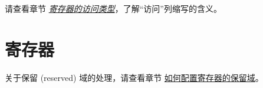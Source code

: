\documentclass[main\_\_CN.tex]{subfiles}
\begin{document}
请查看章节 \hyperref[glossary-access-types]{\textit{寄存器的访问类型}}，了解“访问”列缩写的含义。







\newpage
\section{寄存器}
\label{sec:rng-reg}

关于保留 (reserved) 域的处理，请查看章节 \hyperref[programming-reserved-field]{如何配置寄存器的保留域}。


\end{document}
